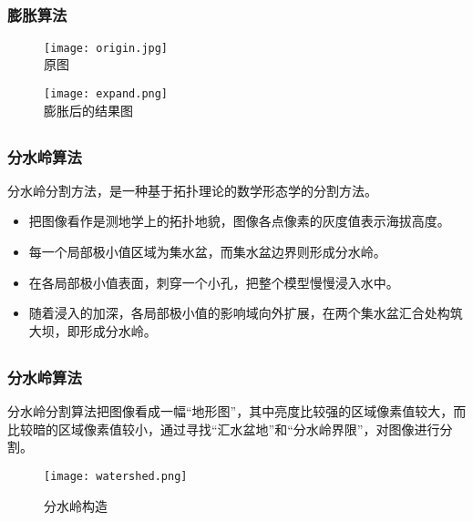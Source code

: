 \documentclass[notheorems,mathserif,table,compress]{beamer}  %
\begin{document}
\subsection{}
\begin{frame}
   \frametitle{膨胀算法}
   \begin{figure}
   \centering
   \texttt{[image: origin.jpg]}\\
   原图
   \end{figure}
   \begin{figure}
   \centering
   \texttt{[image: expand.png]}\\
   膨胀后的结果图
   \end{figure}
\end{frame}

\subsection{}
\begin{frame}
   \frametitle{分水岭算法}
   \hspace{0.2in}分水岭分割方法，是一种基于拓扑理论的数学形态学的分割方法。
   \begin{itemize}
   \item 把图像看作是测地学上的拓扑地貌，图像各点像素的灰度值表示海拔高度。
   \item 每一个局部极小值区域为集水盆，而集水盆边界则形成分水岭。
   \item 在各局部极小值表面，刺穿一个小孔，把整个模型慢慢浸入水中。
   \item 随着浸入的加深，各局部极小值的影响域向外扩展，在两个集水盆汇合处构筑大坝，即形成分水岭。
   \end{itemize}
\end{frame}

\subsection{}
\begin{frame}
   \frametitle{分水岭算法}
   \hspace{0.3in}分水岭分割算法把图像看成一幅“地形图”，其中亮度比较强的区域像素值较大，而比较暗的区域像素值较小，通过寻找“汇水盆地”和“分水岭界限”，对图像进行分割。
   \begin{figure}
   \centering
   \texttt{[image: watershed.png]}
   \caption{分水岭构造}
   \end{figure}
\end{frame}
\end{document}
